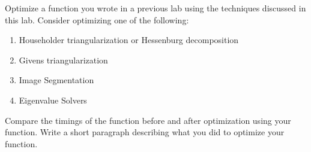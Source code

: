 \begin{problem}
Optimize a function you wrote in a previous lab using the techniques discussed in this lab. Consider optimizing one of the following:
\begin{enumerate}
\item Householder triangularization or Hessenburg decomposition %
\item Givens triangularization %
\item Image Segmentation %
\item Eigenvalue Solvers %
\end{enumerate}
 Compare the timings of the function before and after optimization using your  function. Write a short paragraph describing what you did to optimize your function.
\end{problem}
